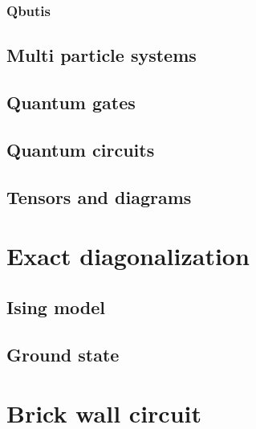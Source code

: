 \documentclass{physics_article_B}
\begin{document}
\subsubsection{Qbutis} %
\label{sub:qubits}

\subsection{Multi particle systems} %
\label{sub:qulti_particle}

\subsection{Quantum gates} %
\label{sub:quantum_gates}

\subsection{Quantum circuits} %
\label{sub:quantum_circuits}

\subsection{Tensors and diagrams} %
\label{sub:tensors_and_diagrams}


\section{Exact diagonalization} %
\label{sec:exact_diagonalization}
\subsection{Ising model} %
\label{sub:ising_model}

\subsection{Ground state} %
\label{sub:ground_state}


\section{Brick wall circuit} %
\label{sec:brick_wall_circuit}
\end{document}
